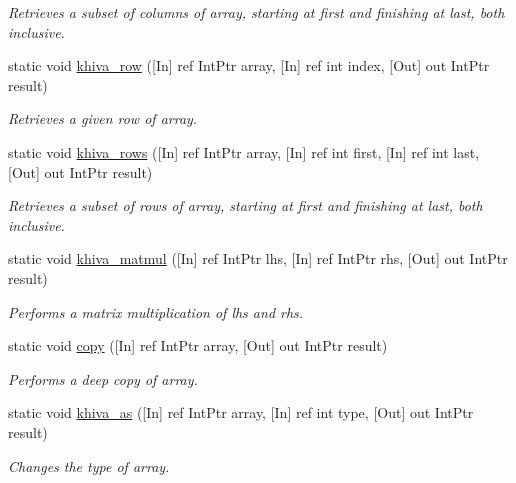 \begin{DoxyCompactItemize}
\begin{DoxyCompactList}\small\item\em Retrieves a subset of columns of array, starting at first and finishing at last, both inclusive.\end{DoxyCompactList}\item 
static void \mbox{\hyperlink{classkhiva_1_1interop_1_1_d_l_l_array_a62afacf313648e9cf65d3c93e0dcae3e}{khiva\+\_\+row}} (\mbox{[}In\mbox{]} ref Int\+Ptr array, \mbox{[}In\mbox{]} ref int index, \mbox{[}Out\mbox{]} out Int\+Ptr result)
\begin{DoxyCompactList}\small\item\em Retrieves a given row of array.\end{DoxyCompactList}\item 
static void \mbox{\hyperlink{classkhiva_1_1interop_1_1_d_l_l_array_addfd86bdfd940e1d93756f49640a6e2a}{khiva\+\_\+rows}} (\mbox{[}In\mbox{]} ref Int\+Ptr array, \mbox{[}In\mbox{]} ref int first, \mbox{[}In\mbox{]} ref int last, \mbox{[}Out\mbox{]} out Int\+Ptr result)
\begin{DoxyCompactList}\small\item\em Retrieves a subset of rows of array, starting at first and finishing at last, both inclusive.\end{DoxyCompactList}\item 
static void \mbox{\hyperlink{classkhiva_1_1interop_1_1_d_l_l_array_a37e6308ea00012bdea79f3efdc7f1f04}{khiva\+\_\+matmul}} (\mbox{[}In\mbox{]} ref Int\+Ptr lhs, \mbox{[}In\mbox{]} ref Int\+Ptr rhs, \mbox{[}Out\mbox{]} out Int\+Ptr result)
\begin{DoxyCompactList}\small\item\em Performs a matrix multiplication of lhs and rhs.\end{DoxyCompactList}\item 
static void \mbox{\hyperlink{classkhiva_1_1interop_1_1_d_l_l_array_af1af3d10d8381ee4720f73463096d4c6}{copy}} (\mbox{[}In\mbox{]} ref Int\+Ptr array, \mbox{[}Out\mbox{]} out Int\+Ptr result)
\begin{DoxyCompactList}\small\item\em Performs a deep copy of array.\end{DoxyCompactList}\item 
static void \mbox{\hyperlink{classkhiva_1_1interop_1_1_d_l_l_array_a88716921138806edf6919de78815ca91}{khiva\+\_\+as}} (\mbox{[}In\mbox{]} ref Int\+Ptr array, \mbox{[}In\mbox{]} ref int type, \mbox{[}Out\mbox{]} out Int\+Ptr result)
\begin{DoxyCompactList}\small\item\em Changes the type of array.\end{DoxyCompactList}\end{DoxyCompactItemize}


